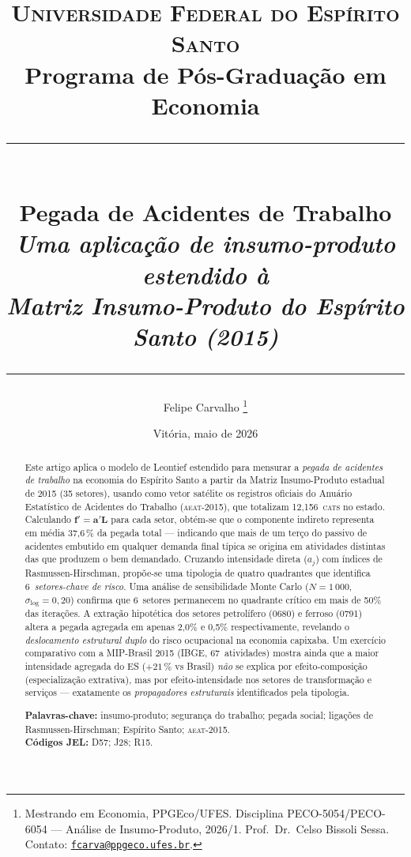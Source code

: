 \documentclass[12pt, a4paper]{article}
\title{%
  \large\textsc{Universidade Federal do Espírito Santo}\\
  \small Programa de Pós-Graduação em Economia\\[0.4em]
  \rule{\linewidth}{0.8pt}\\[0.6em]
  \LARGE\bfseries Pegada de Acidentes de Trabalho\\[0.4em]
  \large\normalfont\itshape
    Uma aplicação de insumo-produto estendido à\\
    Matriz Insumo-Produto do Espírito Santo (2015)\\[0.4em]
  \rule{\linewidth}{0.8pt}
}
\author{%
  \large Felipe Carvalho%
  \thanks{Mestrando em Economia, PPGEco/UFES.
          Disciplina PECO-5054/PECO-6054 --- Análise de Insumo-Produto, 2026/1.
          Prof.\ Dr.\ Celso Bissoli Sessa.
          Contato: \href{mailto:fcarva@ppgeco.ufes.br}{\texttt{fcarva@ppgeco.ufes.br}}.}
}
\date{Vitória, maio de 2026}
\newcommand{\cat}{\textsc{cat}}
\newcommand{\aeat}{\textsc{aeat}}
\begin{document}
\maketitle
\thispagestyle{fancy}
\renewcommand{\abstractname}{\normalfont\normalsize\bfseries Resumo}
\begin{abstract}
\small
Este artigo aplica o modelo de Leontief estendido para mensurar a
\textit{pegada de acidentes de trabalho} na economia do Espírito Santo
a partir da Matriz Insumo-Produto estadual de 2015 (35 setores),
usando como vetor satélite os registros oficiais do Anuário Estatístico
de Acidentes do Trabalho (\aeat-2015), que totalizam 12,156~\cat{}s no
estado. Calculando $\mathbf{f}' = \mathbf{a}'\mathbf{L}$ para cada setor,
obtém-se que o componente indireto representa em média 37{,}6\,\% da
pegada total --- indicando que mais de um terço do passivo de acidentes
embutido em qualquer demanda final típica se origina em atividades
distintas das que produzem o bem demandado.
Cruzando intensidade direta ($a_j$) com índices de Rasmussen-Hirschman,
propõe-se uma tipologia de quatro quadrantes que identifica
6~\textit{setores-chave de risco}.
Uma análise de sensibilidade Monte Carlo ($N = 1\,000$, $\sigma_{\log} = 0{,}20$)
confirma que 6~setores permanecem no quadrante crítico em mais de
50\% das iterações. A extração hipotética dos setores petrolífero (0680)
e ferroso (0791) altera a pegada agregada em apenas 2{,}0\%
e 0{,}5\% respectivamente, revelando o
\textit{deslocamento estrutural duplo} do risco ocupacional na economia
capixaba. Um exercício comparativo com a MIP-Brasil 2015 (IBGE, 67~atividades)
mostra ainda que a maior intensidade agregada do ES ($+21\,\%$ vs Brasil)
\textit{não} se explica por efeito-composição (especialização extrativa),
mas por efeito-intensidade nos setores de transformação e serviços ---
exatamente os \textit{propagadores estruturais} identificados pela
tipologia.

\smallskip
\noindent\textbf{Palavras-chave:} insumo-produto; segurança do trabalho;
pegada social; ligações de Rasmussen-Hirschman; Espírito Santo; \aeat-2015.\\
\noindent\textbf{Códigos JEL:} D57; J28; R15.
\end{abstract}
\end{document}
